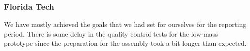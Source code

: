 \subsubsection{Florida Tech} 
We have mostly achieved the goals that we had set for ourselves for the reporting period. There is some delay in the quality control tests for the low-mass prototype since the preparation for the assembly took a bit longer than expected.